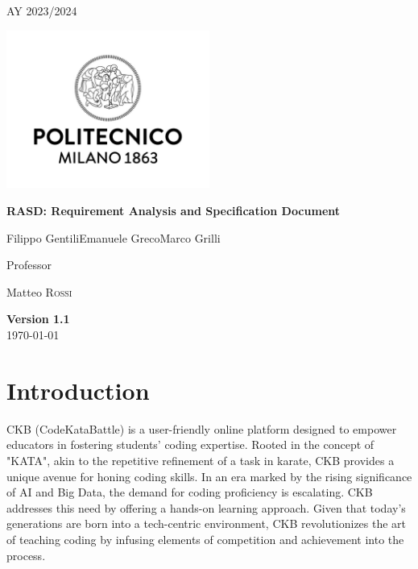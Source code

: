 \documentclass[12pt,oneside,a4paper]{article}
\begin{document}
\begin{titlepage}
    \centering
    {\scshape\large AY 2023/2024 \par}
    \vfill
    \includegraphics[width=0.5\textwidth]{Images/poli.jpg}\par\vspace{1cm}
    \vspace{1.5cm}
    {\huge\bfseries RASD\@: Requirement Analysis
        and Specification Document \par}
    \vspace{2cm}
    {\Large {Filippo Gentili\quad Emanuele Greco\quad Marco Grilli}\par}
    \vfill
    {\large Professor\par
        Matteo \textsc{Rossi}}
    \vfill
    {\large \textbf{Version 1.1}\\ \today \par}
\end{titlepage}


\renewcommand*\contentsname{Contents}

\renewcommand{\baselinestretch}{0.95}\normalsize
\tableofcontents
\renewcommand{\baselinestretch}{1}\normalsize

\pagebreak


\section{Introduction}
CKB (CodeKataBattle) is a user-friendly online platform designed to empower educators in fostering students' coding expertise. Rooted in the concept of "KATA", akin to the repetitive refinement of a task in karate, CKB provides a unique avenue for honing coding skills.
In an era marked by the rising significance of AI and Big Data, the demand for coding proficiency is escalating. CKB addresses this need by offering a hands-on learning approach.
Given that today's generations are born into a tech-centric environment, CKB revolutionizes the art of teaching coding by infusing elements of competition and achievement into the process.
\end{document}
